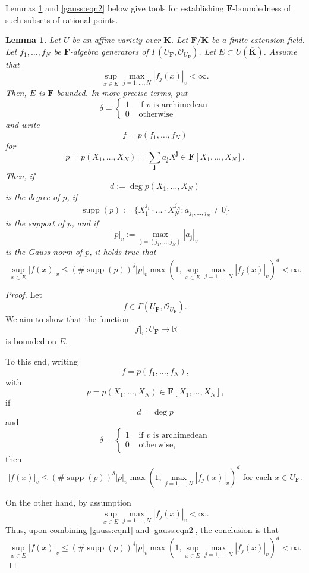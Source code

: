 \documentclass[10pt]{amsart}
\renewcommand{\leq}{\leqslant}
\newcommand{\Osh}{{\mathcal O}}                        %
\newcommand{\KK}{\mathbf{K}}
\newcommand{\FF}{\mathbf{F}}
\newcommand{\RR}{\mathbb{R}} %
\newtheorem{lemma}[theorem]{Lemma}
\theoremstyle{definition}
\numberwithin{equation}{section}
\begin{document}
Lemmas \ref{effective:Hilb:Null:lemma:1} and \ref{gauss:eqn2} below give tools for establishing $\FF$-boundedness of such subsets of rational points.
 
\begin{lemma}\label{effective:Hilb:Null:lemma:1}    Let $U$ be an affine variety over $\KK$.  Let $\FF / \KK$ be a finite extension field.  Let $f_1,\dots,f_N$ be $\FF$-algebra generators of $\Gamma(U_{\FF},\Osh_{U_{\FF}})$.   Let $E \subset U(\overline{\KK}) $.   Assume that
$$
\sup_{x \in E} \max_{j=1,\dots,N} |f_j(x)|_v < \infty \text{.}
$$
Then, $E$ is $\FF$-bounded.  In more precise terms, put
$$
\delta =
\begin{cases}
1 & \text{ if $v$ is archimedean} \\
0 & \text{ otherwise} 
\end{cases}
$$
and write
$$
f = p(f_1,\dots,f_N) 
$$
for
$$
p = p(X_1,\dots,X_{N}) = \sum_{\mathbf{j}} a_{\mathbf{j}} X^{\mathbf{j}} \in \FF[X_1,\dots,X_N] \text{.}
$$
Then, if 
$$
d := \operatorname{deg} p(X_1,\dots,X_N)
$$
is the degree of $p$, if 
$$
\operatorname{supp}(p) := \{X_1^{j_1}\cdot \hdots \cdot X_N^{j_N} : a_{j_1,\dots,j_N} \not = 0 \}
$$
is the support of $p$, and if 
$$|p|_v := \max_{\mathbf{j} = (j_1,\dots,j_N)} |a_{\mathbf{j}}|_v $$ 
is the Gauss norm of $p$, it holds true that
$$
\sup_{x \in E} |f(x)|_v \leq \left( \# \operatorname{supp} (p)\right)^{\delta} \left| p \right|_v \max \left( 1, \sup_{x \in E} \max_{j=1,\dots,N} |f_j(x)|_v \right)^{d} < \infty \text{.}
$$
\end{lemma}

\begin{proof}
Let
$$
f \in \Gamma(U_{\FF},\Osh_{U_{\FF}}) \text{.}
$$
We aim to show that the function
$$
|f|_v \colon U_{\FF} \rightarrow \RR
$$
is bounded on $E$.

To this end, writing
$$
f = p(f_1,\dots,f_N) \text{,}
$$
with
$$
p = p(X_1,\dots,X_N) \in \FF[X_1,\dots,X_N] \text{,}
$$
if
$$
d = \operatorname{deg} p
$$
and
$$
\delta =
\begin{cases}
1 & \text{ if $v$ is archimedean} \\
0 & \text{ otherwise} \text{,}
\end{cases}
$$
then
\begin{equation}\label{gauss:eqn1}
|f(x)|_v \leq (\# \operatorname{supp}(p))^\delta |p|_v \max(1,\operatorname{max}_{j = 1,\dots,N} |f_j(x)|_v)^d \text{ for each $x \in U_{\FF}$.}
\end{equation}

On the other hand, by assumption
\begin{equation}\label{gauss:eqn2}
\sup_{x \in E} \max_{j=1,\dots,N} |f_j(x)|_v < \infty \text{.}
\end{equation}
Thus, upon combining \eqref{gauss:eqn1} and \eqref{gauss:eqn2}, the conclusion is that
$$
\sup_{x \in E}|f(x)|_v \leq (\# \operatorname{supp}(p))^\delta |p|_v \max\left(1,\sup_{x \in E} \max_{j=1,\dots,N}|f_j(x)|_v\right)^d < \infty \text{.}
$$
\end{proof}
\end{document}
